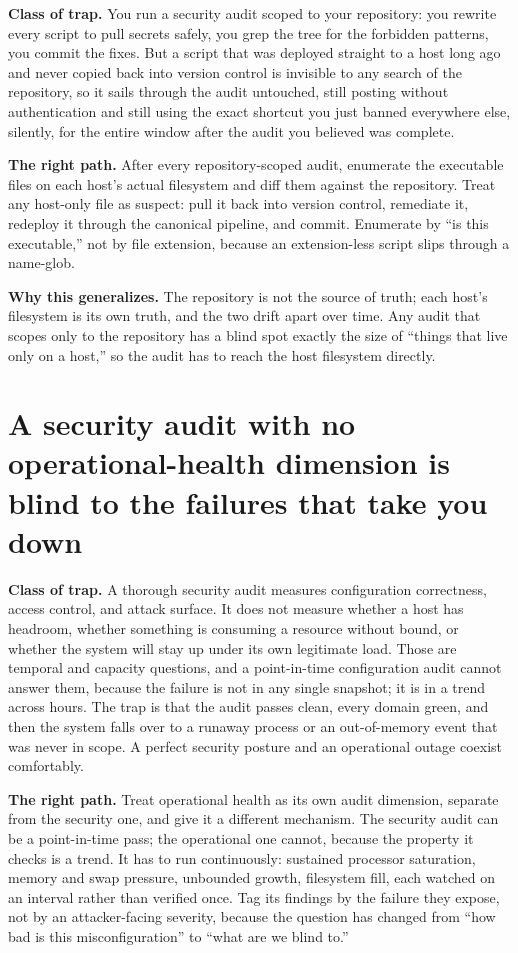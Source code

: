 \documentclass[12pt]{article}
\begin{document}
\textbf{Class of trap.} You run a security audit scoped to your repository: you rewrite every script to pull secrets safely, you grep the tree for the forbidden patterns, you commit the fixes. But a script that was deployed straight to a host long ago and never copied back into version control is invisible to any search of the repository, so it sails through the audit untouched, still posting without authentication and still using the exact shortcut you just banned everywhere else, silently, for the entire window after the audit you believed was complete.

\textbf{The right path.} After every repository-scoped audit, enumerate the executable files on each host's actual filesystem and diff them against the repository. Treat any host-only file as suspect: pull it back into version control, remediate it, redeploy it through the canonical pipeline, and commit. Enumerate by ``is this executable,'' not by file extension, because an extension-less script slips through a name-glob.

\textbf{Why this generalizes.} The repository is not the source of truth; each host's filesystem is its own truth, and the two drift apart over time. Any audit that scopes only to the repository has a blind spot exactly the size of ``things that live only on a host,'' so the audit has to reach the host filesystem directly.

\section{A security audit with no operational-health dimension is blind to the failures that take you down}

\textbf{Class of trap.} A thorough security audit measures configuration correctness, access control, and attack surface. It does not measure whether a host has headroom, whether something is consuming a resource without bound, or whether the system will stay up under its own legitimate load. Those are temporal and capacity questions, and a point-in-time configuration audit cannot answer them, because the failure is not in any single snapshot; it is in a trend across hours. The trap is that the audit passes clean, every domain green, and then the system falls over to a runaway process or an out-of-memory event that was never in scope. A perfect security posture and an operational outage coexist comfortably.

\textbf{The right path.} Treat operational health as its own audit dimension, separate from the security one, and give it a different mechanism. The security audit can be a point-in-time pass; the operational one cannot, because the property it checks is a trend. It has to run continuously: sustained processor saturation, memory and swap pressure, unbounded growth, filesystem fill, each watched on an interval rather than verified once. Tag its findings by the failure they expose, not by an attacker-facing severity, because the question has changed from ``how bad is this misconfiguration'' to ``what are we blind to.''
\end{document}
